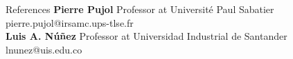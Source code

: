 \begin{rubric}{References}
\textbf{Pierre Pujol} \hspace{1cm} Professor at Université Paul Sabatier \hspace{2.85cm} pierre.pujol@irsamc.ups-tlse.fr\\
\textbf{Luis A. Núñez} \hspace{0.66cm} Professor at Universidad Industrial de Santander \hspace{1.04cm} lnunez@uis.edu.co
\end{rubric}
